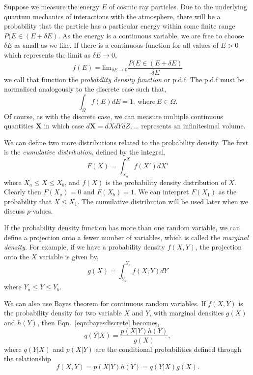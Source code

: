 Suppose we measure the energy $E$ of cosmic ray particles. Due to the underlying quantum mechanics of interactions with the atmosphere, there will be a probability that the particle has a particular energy within some finite range $P(E \in (E+\delta E)$. As the energy is a continuous variable, we are free to choose $\delta E$ as small as we like. If there is a continuous function for all values of $E>0$ which represents the limit as $\delta E\rightarrow 0$, 
\begin{equation}
    f(E) = \mathrm{lim}_{\delta E\rightarrow 0}\frac{P(E \in (E+\delta E)}{\delta E}
\end{equation}
we call that function the \emph{probability density function} or p.d.f. The p.d.f must be normalised analogously to the discrete case such that, \begin{equation}
    \int_{\Omega} f(E)dE = 1, ~\mathrm{where} ~E\in\Omega.
\end{equation} 
Of course, as with the discrete case, we can measure multiple continuous quantities $\mathbf{X}$ in which case $d\mathbf{X}=dXdYdZ,...$ represents an infinitesimal volume. 

We can define two more distributions related to the probability density. The first is the \emph{cumulative distribution}, defined by the integral, 
\begin{equation}
    F(X) = \int_{X_{a}}^X f(X')dX' 
\end{equation}
where $X_a \leq X \leq X_b$, and $f(X)$ is the probability density distribution of $X$. Clearly then $F(X_a)=0$ and $F(X_b)=1$. We can interpret $F(X_{1})$ as the probability that $X\leq X_1$.  The cumulative distribution will be used later when we discuss $p$-values.

If the probability density function has more than one random variable, we can define a projection onto a fewer number of variables, which is called the \emph{marginal density}. For example, if we have a probability density $f(X,Y)$, the projection onto the $X$ variable is given by, 
\begin{equation}\label{eqn:marginal}
    g(X) = \int_{Y_{a}}^{Y_{b}} f(X,Y)dY 
\end{equation}
where $Y_a \leq Y \leq Y_b$.

We can also use Bayes theorem for continuous random variables. If $f(X,Y)$ is the probability density for two variable $X$ and $Y$, with marginal densities $g(X)$ and $h(Y)$, then Eqn.~\ref{eqn:bayesdiscrete} becomes, 
\begin{equation}
    q(Y|X) = \frac{p(X|Y)h(Y)}{g(X)},
\end{equation}
where $q(Y|X)$ and $p(X|Y)$ are the conditional probabilities defined through the relationship 
\begin{equation}
   f(X,Y)= p(X|Y)h(Y) = q(Y|X)g(X).
\end{equation}

